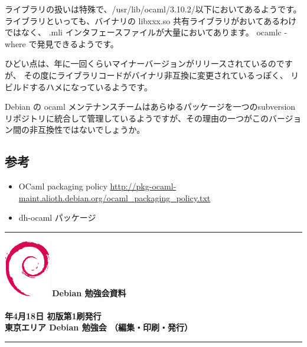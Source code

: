\documentclass[mingoth,a4paper]{jsarticle}
\newcommand{\debmtgyear}{2009}
\newcommand{\debmtgmonth}{4}
\newcommand{\debmtgdate}{18}
\begin{document}
ライブラリの扱いは特殊で、/usr/lib/ocaml/3.10.2/以下においてあるようです。
ライブラリといっても、バイナリの libxxx.so 共有ライブラリがおいてあるわけではなく、
.mli インタフェースファイルが大量においてあります。
ocamlc -where で発見できるようです。


ひどい点は、年に一回くらいマイナーバージョンがリリースされているのですが、
その度にライブラリコードがバイナリ非互換に変更されているっぽく、
リビルドするハメになっているようです。

Debian の ocaml メンテナンスチームはあらゆるパッケージを一つのsubversion
リポジトリに統合して管理しているようですが、その理由の一つがこのバージョ
ン間の非互換性ではないでしょうか。

\subsection{参考}
\begin{itemize}
 \item OCaml packaging policy
       \url{http://pkg-ocaml-maint.alioth.debian.org/ocaml_packaging_policy.txt}
 \item dh-ocaml パッケージ
\end{itemize}

\clearpage


\cleartooddpage

\vspace*{15cm}
\hrule
\vspace{2mm}
\includegraphics[width=2cm]{image200502/openlogo-nd.eps}
\noindent \Large \bf Debian 勉強会資料\\ \\
\noindent \normalfont \debmtgyear{}年\debmtgmonth{}月\debmtgdate{}日 \hspace{5mm}  初版第1刷発行\\
\noindent \normalfont 東京エリア Debian 勉強会 （編集・印刷・発行）\\
\hrule
\end{document}
